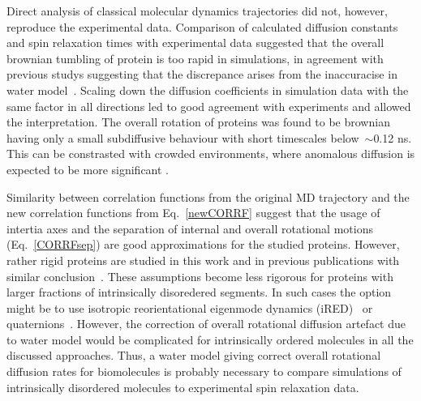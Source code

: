 \documentclass[pre,aps,floatfix,authordate1-4,twocolumn]{revtex4-1}
\begin{document}
Direct analysis of classical molecular dynamics trajectories did not, however,
reproduce the experimental data. Comparison of calculated diffusion constants
and spin relaxation times with experimental data suggested that
the overall brownian tumbling of protein is too rapid in simulations,
in agreement with previous studys suggesting that the discrepance arises
from the inaccuracise in water model~\cite{wong08}.
Scaling down the diffusion coefficients in simulation data
with the same factor in all directions 
led to good agreement with experiments and allowed the interpretation.
The overall rotation of proteins was found to be brownian having
only a small subdiffusive behaviour with short timescales
below~$\sim$0.12 ns. This can be constrasted with crowded environments,
where anomalous diffusion is expected to be more significant \cite{hofling13}.

Similarity between correlation functions from the original MD trajectory and
the new correlation functions from Eq.~\ref{newCORRF} 
suggest that the usage of intertia axes
and the separation of internal and overall rotational motions
(Eq.~\ref{CORRFsep}) are good approximations for the studied
proteins. However, rather rigid proteins are studied in this
work and in previous publications with similar conclusion~\cite{wong08,allner15}.
These assumptions become less rigorous for proteins with larger
fractions of intrinsically disoredered segments. In such cases the option
might be to use isotropic reorientational eigenmode dynamics (iRED)~\cite{prompers02}
or quaternions~\cite{anderson12}. However, the correction of overall
rotational diffusion artefact due to water model would be complicated
for intrinsically ordered molecules in all the discussed approaches.
Thus, a water model giving correct
overall rotational diffusion rates for biomolecules is probably necessary
to compare simulations of intrinsically disordered molecules
to experimental spin relaxation data.
\end{document}
